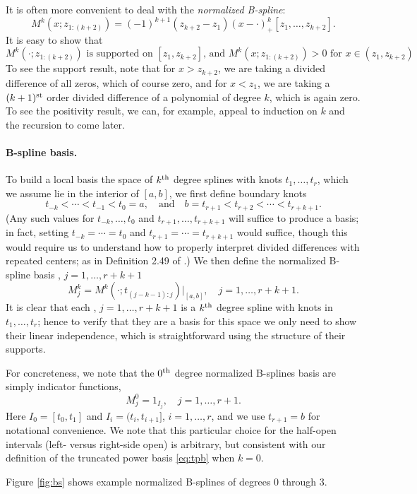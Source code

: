 \documentclass{article}
\begin{document}
It is often more convenient to deal with the \emph{normalized B-spline}:
\[
M^k(x; z_{1:(k+2)}) = (-1)^{k+1} (z_{k+2}-z_1) 
(x - \cdot)^k_+[z_1,\dots,z_{k+2}]. 
\]
It is easy to show that 
\[
\text{$M^k(\cdot; z_{1:(k+2)})$ is supported on $[z_1,z_{k+2}]$, and  
$M^k(x; z_{1:(k+2)})>0$ for $x \in (z_1,z_{k+2})$}.  
\]
To see the support result, note that for $x > z_{k+2}$, we are taking a divided
difference of all zeros, which of course zero, and for $x < z_1$, we are taking 
a $(k+1)^{\text{st}}$ order divided difference of a polynomial of degree $k$, which is
again zero. To see the positivity result, we can, for example, appeal to 
induction on $k$ and the recursion to come later.

\paragraph{B-spline basis.}  

To build a local basis the space of $k^{\text{th}}$ degree splines with knots
$t_1,\dots,t_r$, which we assume lie in the interior of $[a,b]$, we first define
boundary knots   
\[
t_{-k} < \cdots < t_{-1} < t_0 = a, \quad \text{and} \quad 
b = t_{r+1} < t_{r+2} < \cdots < t_{r+k+1}. 
\]
(Any such values for $t_{-k},\dots,t_0$ and $t_{r+1},\dots,t_{r+k+1}$ will
suffice to produce a basis; in fact, setting $t_{-k}=\cdots=t_0$ and
$t_{r+1}=\cdots=t_{r+k+1}$ would suffice, though this would require us to 
understand how to properly interpret divided differences with repeated centers;
as in Definition 2.49 of \citet{schumaker2007spline}.)  We then define the
normalized B-spline basis , $j=1,\dots,r+k+1$ 
\[
M^k_j = M^k(\cdot ; t_{(j-k-1):j}) \Big|_{[a,b]}, 
\quad j=1,\dots,r+k+1. 
\]
It is clear that each , $j=1,\dots,r+k+1$ is a $k^{\text{th}}$ degree    
spline with knots in $t_1,\dots,t_r$; hence to verify that they are a basis for
this space we only need to show their linear independence, which is
straightforward using the structure of their supports. 

For concreteness, we note that the $0^{\text{th}}$ degree normalized B-splines basis are
simply indicator functions,
\[
M^0_j = 1_{I_j}, \quad j=1,\dots,r+1.
\]
Here $I_0=[t_0,t_1]$ and $I_i=(t_i,t_{i+1}]$, $i=1,\dots,r$, and we use
$t_{r+1}=b$ for notational convenience. We note that this particular choice for
the half-open intervals (left- versus right-side open) is arbitrary, but
consistent with our definition of the truncated power basis \eqref{eq:tpb}
when $k=0$. 

Figure \ref{fig:bs} shows example normalized B-splines of degrees 0 through 3.    
\end{document}
